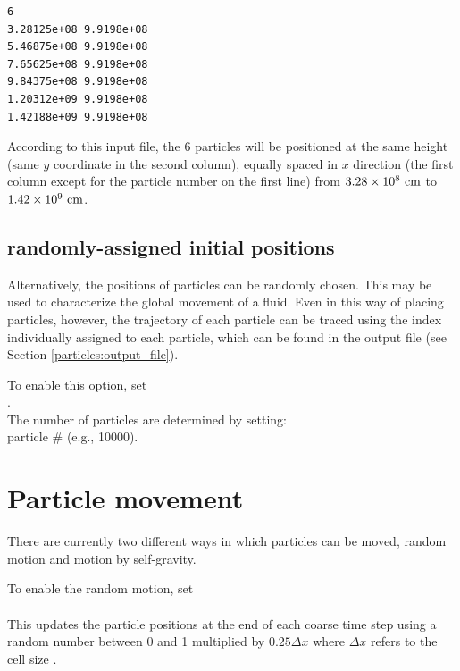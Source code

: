 \begin{lstlisting}
6
3.28125e+08 9.9198e+08 
5.46875e+08 9.9198e+08 
7.65625e+08 9.9198e+08 
9.84375e+08 9.9198e+08 
1.20312e+09 9.9198e+08 
1.42188e+09 9.9198e+08 
\end{lstlisting}

According to this input file, the 6 particles will be positioned at the same height (same $y$ coordinate in the second column), equally spaced in $x$ direction (the first column except for the particle number on the first line) from $3.28\times10^{8} {\rm ~cm}$ to $1.42\times 10^{9} {\rm ~cm}$.
	
\subsection{randomly-assigned initial positions}
\label{particle:randomplacement}
Alternatively, the positions of particles can be randomly chosen. This may be used to characterize the global movement of a fluid. Even in this way of placing particles, however, the trajectory of each particle can be traced using the index individually assigned to each particle, which can be found in the output file (see Section \ref{particles:output_file}).

To enable this option, set \\

. \\

\noindent The number of particles are determined by setting: \\

 particle \# (e.g., 10000).


\section{Particle movement}
\noindent There are currently two different ways in which particles can be moved, random motion and motion by self-gravity.

\noindent To enable the random motion, set \\

 \\

\noindent This updates the particle positions at the end of each coarse time step using a 
random number between 0 and 1 multiplied by $0.25 \Delta x$ where $\Delta x$ refers to the cell size .


